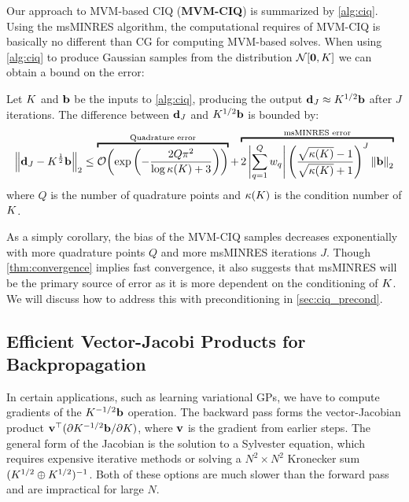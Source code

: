 Our approach to MVM-based CIQ ({\bf MVM-CIQ}) is summarized by \cref{alg:ciq}.
Using the msMINRES algorithm, the computational requires of MVM-CIQ is basically no different than CG for computing MVM-based solves.
When using \cref{alg:ciq} to produce Gaussian samples from the distribution $\normaldist{\bzero}{\bK}$ we can obtain a bound on the error:
%
\begin{theorem}
  Let $K$ and $\mathbf{b}$ be the inputs to \cref{alg:ciq}, producing the output $\mathbf{d}_J \approx K^{1/2} \mathbf{b}$ after $J$ iterations.
  The difference between $\mathbf{d}_J$ and $K^{1/2} \mathbf{b}$ is bounded by:
  \begin{equation}
    \left\Vert \bd_J - \bK^{\frac 1 2} \bb \right\Vert_2
    \leq
    \overbracket{
      \bigo{\exp\left( -\frac{2 Q \pi^2}{\log \kappa(\bK) + 3} \right)}
    }^{\text{Quadrature error}}
    +
    \overbracket{
      2 \left\vert \sum_{q=1}^Q w_q \right\vert
      \left( \frac{ \sqrt{\kappa(\bK)} - 1}{ \sqrt{\kappa(\bK)} + 1} \right)^J
      \left\Vert \bb \right\Vert_2
    }^{\text{msMINRES error}}
  \end{equation}
  where $Q$ is the number of quadrature points and $\kappa(K)$ is the condition number of $K$.
  \label{thm:convergence}
\end{theorem}
%
As a simply corollary, the bias of the MVM-CIQ samples decreases exponentially with more quadrature points $Q$ and more msMINRES iterations $J$.
Though \cref{thm:convergence} implies fast convergence, it also suggests that msMINRES will be the primary source of error as it is more dependent on the conditioning of $K$.
We will discuss how to address this with preconditioning in \cref{sec:ciq_precond}.



\subsection{Efficient Vector-Jacobi Products for Backpropagation}

In certain applications, such as learning variational GPs, we have to compute gradients of the $K^{-1/2} \mathbf{b}$ operation.
The backward pass forms the vector-Jacobian product $\mathbf{v}^\top ( \partial K^{-1/2} \mathbf{b} / \partial K)$, where $\mathbf{v}$ is the gradient from earlier steps.
The general form of the Jacobian is the solution to a Sylvester equation, which requires expensive iterative methods or solving a $N^2 \times N^2$ Kronecker sum $(K^{1/2} \oplus K^{1/2})^{-1}$.
Both of these options are much slower than the forward pass and are impractical for large $N$.

